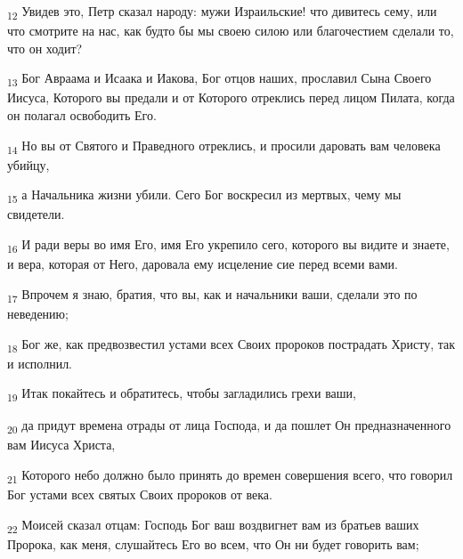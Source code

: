 \begin{tcolorbox}
\textsubscript{12} Увидев это, Петр сказал народу: мужи Израильские! что дивитесь сему, или что смотрите на нас, как будто бы мы своею силою или благочестием сделали то, что он ходит?
\end{tcolorbox}
\begin{tcolorbox}
\textsubscript{13} Бог Авраама и Исаака и Иакова, Бог отцов наших, прославил Сына Своего Иисуса, Которого вы предали и от Которого отреклись перед лицом Пилата, когда он полагал освободить Его.
\end{tcolorbox}
\begin{tcolorbox}
\textsubscript{14} Но вы от Святого и Праведного отреклись, и просили даровать вам человека убийцу,
\end{tcolorbox}
\begin{tcolorbox}
\textsubscript{15} а Начальника жизни убили. Сего Бог воскресил из мертвых, чему мы свидетели.
\end{tcolorbox}
\begin{tcolorbox}
\textsubscript{16} И ради веры во имя Его, имя Его укрепило сего, которого вы видите и знаете, и вера, которая от Него, даровала ему исцеление сие перед всеми вами.
\end{tcolorbox}
\begin{tcolorbox}
\textsubscript{17} Впрочем я знаю, братия, что вы, как и начальники ваши, сделали это по неведению;
\end{tcolorbox}
\begin{tcolorbox}
\textsubscript{18} Бог же, как предвозвестил устами всех Своих пророков пострадать Христу, так и исполнил.
\end{tcolorbox}
\begin{tcolorbox}
\textsubscript{19} Итак покайтесь и обратитесь, чтобы загладились грехи ваши,
\end{tcolorbox}
\begin{tcolorbox}
\textsubscript{20} да придут времена отрады от лица Господа, и да пошлет Он предназначенного вам Иисуса Христа,
\end{tcolorbox}
\begin{tcolorbox}
\textsubscript{21} Которого небо должно было принять до времен совершения всего, что говорил Бог устами всех святых Своих пророков от века.
\end{tcolorbox}
\begin{tcolorbox}
\textsubscript{22} Моисей сказал отцам: Господь Бог ваш воздвигнет вам из братьев ваших Пророка, как меня, слушайтесь Его во всем, что Он ни будет говорить вам;
\end{tcolorbox}
